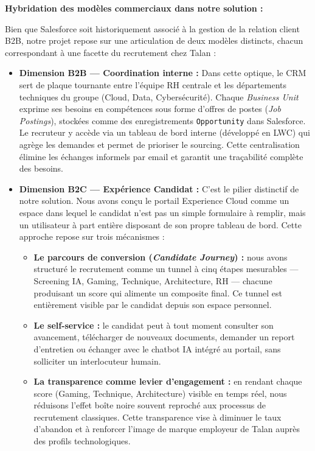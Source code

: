 \medskip
\textbf{Hybridation des modèles commerciaux dans notre solution :}

\medskip

Bien que Salesforce soit historiquement associé à la gestion de la relation client B2B, notre projet repose sur une articulation de deux modèles distincts, chacun correspondant à une facette du recrutement chez Talan :

\begin{itemize}
    \item \textbf{Dimension B2B --- Coordination interne :} 
    Dans cette optique, le CRM sert de plaque tournante entre l'équipe RH centrale et les départements techniques du groupe (Cloud, Data, Cybersécurité). Chaque \textit{Business Unit} exprime ses besoins en compétences sous forme d'offres de postes (\textit{Job Postings}), stockées comme des enregistrements \texttt{Opportunity} dans Salesforce. Le recruteur y accède via un tableau de bord interne (développé en LWC) qui agrège les demandes et permet de prioriser le sourcing. Cette centralisation élimine les échanges informels par email et garantit une traçabilité complète des besoins.

    \item \textbf{Dimension B2C --- Expérience Candidat :} 
    C'est le pilier distinctif de notre solution. Nous avons conçu le portail Experience Cloud comme un espace dans lequel le candidat n'est pas un simple formulaire à remplir, mais un utilisateur à part entière disposant de son propre tableau de bord. Cette approche repose sur trois mécanismes :
    \begin{itemize}
        \item \textbf{Le parcours de conversion (\textit{Candidate Journey}) :} nous avons structuré le recrutement comme un tunnel à cinq étapes mesurables --- Screening IA, Gaming, Technique, Architecture, RH --- chacune produisant un score qui alimente un composite final. Ce tunnel est entièrement visible par le candidat depuis son espace personnel.
        \item \textbf{Le self-service :} le candidat peut à tout moment consulter son avancement, télécharger de nouveaux documents, demander un report d'entretien ou échanger avec le chatbot IA intégré au portail, sans solliciter un interlocuteur humain.
        \item \textbf{La transparence comme levier d'engagement :} en rendant chaque score (Gaming, Technique, Architecture) visible en temps réel, nous réduisons l'effet \og boîte noire \fg{} souvent reproché aux processus de recrutement classiques. Cette transparence vise à diminuer le taux d'abandon et à renforcer l'image de marque employeur de Talan auprès des profils technologiques.
    \end{itemize}
\end{itemize}

